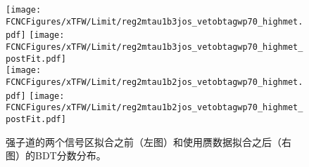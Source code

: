 \begin{figure}[H]
\centering
\texttt{[image: \\FCNCFigures/xTFW/Limit/reg2mtau1b3jos\_vetobtagwp70\_highmet.pdf]}
\texttt{[image: \\FCNCFigures/xTFW/Limit/reg2mtau1b3jos\_vetobtagwp70\_highmet\_postFit.pdf]}\\
\texttt{[image: \\FCNCFigures/xTFW/Limit/reg2mtau1b2jos\_vetobtagwp70\_highmet.pdf]}
\texttt{[image: \\FCNCFigures/xTFW/Limit/reg2mtau1b2jos\_vetobtagwp70\_highmet\_postFit.pdf]}

\caption{ 强子道的两个信号区拟合之前（左图）和使用赝数据拟合之后（右图）的BDT分数分布。}
\label{fig:xTFW_trexPrefit}
\end{figure}
